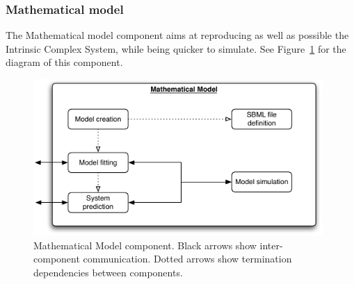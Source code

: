 \documentclass[letterpaper, oneside]{article}
\begin{document}
\subsubsection{Mathematical model} %
\label{ssub:mathematical_model}

The Mathematical model component aims at reproducing as well as possible the Intrinsic Complex System, while being quicker to simulate. See Figure~\ref{fig:img_mathematical_model} for the diagram of this component.

\begin{figure}[h!]
	\centering
		\includegraphics[width=11cm]{img/mathematical_model.pdf}
	\caption{Mathematical Model component. Black arrows show inter-component communication. Dotted arrows show termination dependencies between components.}
	\label{fig:img_mathematical_model}
\end{figure}
\end{document}
